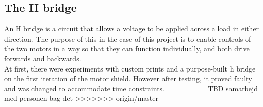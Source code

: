 \subsection{The H bridge}

An H bridge is a circuit that allows a voltage to be applied across a load in either direction. The purpose of this in the case of this project is to enable controls of the two motors in a way so that they can function individually, and both drive forwards and backwards.\\
At first, there were experiments with custom prints and a purpose-built h bridge on the first iteration of the motor shield. However after testing, it proved faulty and was changed to accommodate time constraints.
=======
TBD samarbejd med personen bag det
>>>>>>> origin/master
